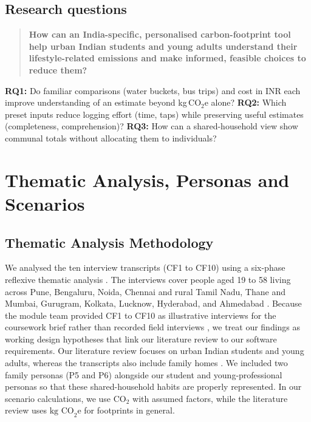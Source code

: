 \documentclass[12pt, a4paper]{article}
\begin{document}
\subsection{Research questions}
\begin{quote}
\small
\textbf{How can an India-specific, personalised carbon-footprint tool help urban Indian students and young adults understand their lifestyle-related emissions and make informed, feasible choices to reduce them?}
\end{quote}
\textbf{RQ1:} Do familiar comparisons (water buckets, bus trips) and cost in INR each improve understanding of an estimate beyond kg\,CO$_2$e alone? \textbf{RQ2:} Which preset inputs reduce logging effort (time, taps) while preserving useful estimates (completeness, comprehension)? \textbf{RQ3:} How can a shared-household view show communal totals without allocating them to individuals?

\clearpage
\section{Thematic Analysis, Personas and Scenarios}
\subsection{Thematic Analysis Methodology}
We analysed the ten interview transcripts (CF1 to CF10) \cite{cf1, cf2, cf3, cf4, cf5, cf6, cf7, cf8, cf9, cf10} using a six-phase reflexive thematic analysis . The interviews cover people aged 19 to 58 living across Pune, Bengaluru, Noida, Chennai and rural Tamil Nadu, Thane and Mumbai, Gurugram, Kolkata, Lucknow, Hyderabad, and Ahmedabad \cite{cf1, cf2, cf3, cf4, cf5, cf6, cf7, cf8, cf9, cf10}. Because the module team provided CF1 to CF10 as illustrative interviews for the coursework brief rather than recorded field interviews \cite{cf1, cf10} , we treat our findings as working design hypotheses that link our literature review to our software requirements. Our literature review focuses on urban Indian students and young adults, whereas the transcripts also include family homes \cite{cf3, cf6, cf8}. We included two family personas (P5 and P6) alongside our student and young-professional personas so that these shared-household habits are properly represented. In our scenario calculations, we use $\text{CO}_2$ with assumed factors, while the literature review uses $\text{kg CO}_2\text{e}$ for footprints in general.
\end{document}
